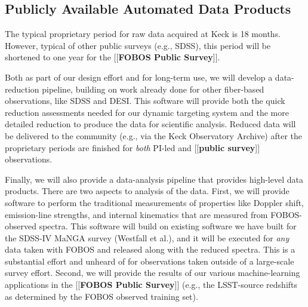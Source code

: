 \documentclass[oneside,11pt]{amsart}
\newcommand{\comment}[2][todo]{{\color{#1}[[{\bf #2}]]}}
\begin{document}

\subsection{Publicly Available Automated Data Products}
\label{sec:DAP}

The typical proprietary period for raw data acquired at Keck is 18
months.  However, typical of other public surveys (e.g., SDSS), this
period will be shortened to one year for the \comment{FOBOS Public Survey}.

Both as part of our design effort and for long-term use, we will develop
a data-reduction pipeline, building on work already done for other
fiber-based observations, like SDSS and DESI.  This software will
provide both the quick reduction assessments needed for our dynamic
targeting system and the more detailed reduction to produce the data for
scientific analysis.  Reduced data will be delivered to the community
(e.g., via the Keck Observatory Archive) after the proprietary periods
are finished for {\it both} PI-led and \comment{public survey} observations.

Finally, we will also provide a data-analysis pipeline that provides
high-level data products.  There are two aspects to analysis of the
data.  First, we will provide software to perform the traditional
measurements of properties like Doppler shift, emission-line strengths,
and internal kinematics that are measured from FOBOS-observed spectra.
This software will build on existing software we have built for the
SDSS-IV MaNGA survey (Westfall et al.), and it will be executed for {\it
any} data taken with FOBOS and released along with the reduced spectra.
This is a substantial effort and unheard of for observations taken
outside of a large-scale survey effort.  Second, we will provide the
results of our various machine-learning applications in the \comment{FOBOS Public
Survey} (e.g., the LSST-source redshifts as determined by the FOBOS
observed training set).
\end{document}
